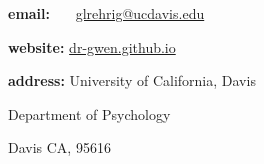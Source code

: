 %
%
\noindent\textbf{email:} ~~~\href{mailto:glrehrig@ucdavis.edu}{glrehrig@ucdavis.edu}


\noindent\textbf{website:} \href{https://dr-gwen.github.io/}{dr-gwen.github.io}


\noindent\textbf{address:} University of California, Davis

\indent \hphantom{~~~~~~~~} Department of Psychology


\indent \hphantom{~~~~~~~~} Davis CA, 95616

